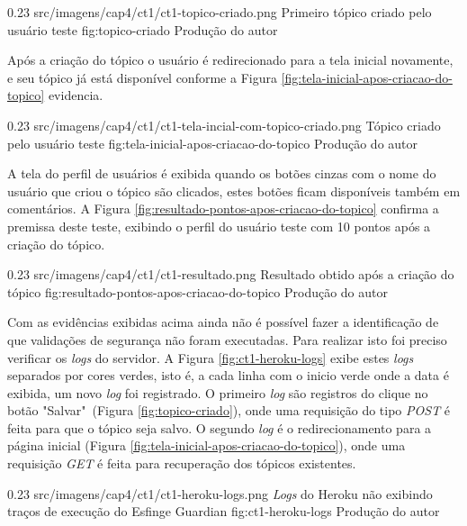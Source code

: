 \begin{image}
{0.23}
{src/imagens/cap4/ct1/ct1-topico-criado.png}
{Primeiro tópico criado pelo usuário teste}
{fig:topico-criado}
{Produção do autor}
\end{image}

\par Após a criação do tópico o usuário é redirecionado para a tela inicial novamente, e seu tópico já está disponível conforme a Figura \ref{fig:tela-inicial-apos-criacao-do-topico} evidencia.

\begin{image}
{0.23}
{src/imagens/cap4/ct1/ct1-tela-incial-com-topico-criado.png}
{Tópico criado pelo usuário teste}
{fig:tela-inicial-apos-criacao-do-topico}
{Produção do autor}
\end{image}

\par A tela do perfil de usuários é exibida quando os botões cinzas com o nome do usuário que criou o tópico são clicados, estes botões ficam disponíveis também em comentários. A Figura \ref{fig:resultado-pontos-apos-criacao-do-topico} confirma a premissa deste teste, exibindo o perfil do usuário teste com 10 pontos após a criação do tópico.

\begin{image}
{0.23}
{src/imagens/cap4/ct1/ct1-resultado.png}
{Resultado obtido após a criação do tópico}
{fig:resultado-pontos-apos-criacao-do-topico}
{Produção do autor}
\end{image}

\par Com as evidências exibidas acima ainda não é possível fazer a identificação de que validações de segurança não foram executadas. Para realizar isto foi preciso verificar os \textit{logs} do servidor. A Figura \ref{fig:ct1-heroku-logs} exibe estes \textit{logs} separados por cores verdes, isto é, a cada linha com o inicio verde onde a data é exibida, um novo \textit{log} foi registrado. O primeiro \textit{log} são registros do clique no botão "Salvar"\ (Figura \ref{fig:topico-criado}), onde uma requisição do tipo \textit{POST} é feita para que o tópico seja salvo. O segundo \textit{log} é o redirecionamento para a página inicial (Figura \ref{fig:tela-inicial-apos-criacao-do-topico}), onde uma requisição \textit{GET} é feita para recuperação dos tópicos existentes.

\begin{image}
{0.23}
{src/imagens/cap4/ct1/ct1-heroku-logs.png}
{\textit{Logs} do Heroku não exibindo traços de execução do Esfinge Guardian}
{fig:ct1-heroku-logs}
{Produção do autor}
\end{image}

